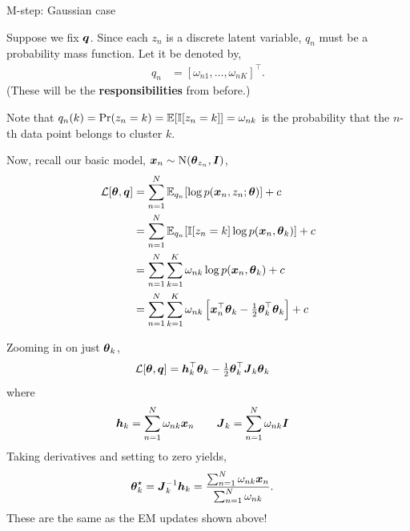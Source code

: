 \documentclass[aspectratio=169]{beamer}
\begin{document}
\begin{frame}[t, allowframebreaks]{M-step: Gaussian case}\label{m-step-gaussian-case}

Suppose we fix \(\boldsymbol{q}\). Since each \(z_n\) is a discrete latent
variable, \(q_n\) must be a probability mass function. Let it be denoted
by, \begin{align*}
    q_n &= [\omega_{n1}, \ldots, \omega_{nK}]^\top.
\end{align*} (These will be the \textbf{responsibilities} from before.)

Note that $q_n(k) = \Pr(z_n = k) = \mathbb{E}[\mathbb{I}[z_n=k]] = \omega_{nk}$ is the probability that the $n$-th data point belongs to cluster $k$.

Now, recall our basic model,
\(\boldsymbol{x}_n \sim \mathrm{N}(\boldsymbol{\theta}_{z_n}, \boldsymbol{I})\), \begin{align*}
    \mathcal{L}[\boldsymbol{\theta}, \boldsymbol{q}] 
    &= \sum_{n=1}^N \mathbb{E}_{q_n} [\log p(\boldsymbol{x}_n, z_n ; \boldsymbol{\theta})] + c \\
    &= \sum_{n=1}^N \mathbb{E}_{q_n} [\mathbb{I}[z_n = k] \log p(\boldsymbol{x}_n, \boldsymbol{\theta}_k)] + c \\
    &= \sum_{n=1}^N \sum_{k=1}^K \omega_{nk} \log p(\boldsymbol{x}_n, \boldsymbol{\theta}_k) + c \\
    &= \sum_{n=1}^N \sum_{k=1}^K \omega_{nk} \left[ \boldsymbol{x}_n^\top \boldsymbol{\theta}_k - \tfrac{1}{2} \boldsymbol{\theta}_k^\top \boldsymbol{\theta}_k \right] + c
\end{align*}

Zooming in on just \(\boldsymbol{\theta}_k\), \begin{align*}
    \mathcal{L}[\boldsymbol{\theta}, \boldsymbol{q}] 
    &= {\boldsymbol{h}}_{k}^\top \boldsymbol{\theta}_k - \tfrac{1}{2} \boldsymbol{\theta}_k^\top \boldsymbol{J}_k \boldsymbol{\theta}_k
\end{align*} where \begin{align*}
    {\boldsymbol{h}}_{k} &= \sum_{n=1}^N \omega_{nk} \boldsymbol{x}_n
    \qquad
    {\boldsymbol{J}}_{k} = \sum_{n=1}^N \omega_{nk} \boldsymbol{I}
\end{align*} Taking derivatives and setting to zero yields,
\begin{align*}
    \boldsymbol{\theta}_k^\star &=  \boldsymbol{J}_k^{-1} \boldsymbol{h}_k 
    = \frac{\sum_{n=1}^N \omega_{nk} \boldsymbol{x}_n}{\sum_{n=1}^N \omega_{nk}}.
\end{align*} These are the same as the EM updates shown above!
\end{frame}
\end{document}
